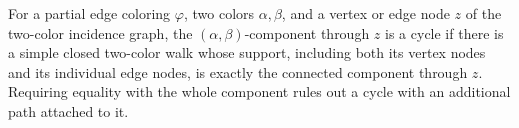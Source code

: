 \begin{definition}
For a partial edge coloring \(\varphi\), two colors \(\alpha,\beta\),
and a vertex or edge node \(z\) of the two-color incidence graph, the
\((\alpha,\beta)\)-component through \(z\) is a cycle if there is a
simple closed two-color walk whose support, including both its vertex nodes
and its individual edge nodes, is exactly the connected component through
\(z\).  Requiring equality with the whole component rules out a cycle with
an additional path attached to it.
\end{definition}
